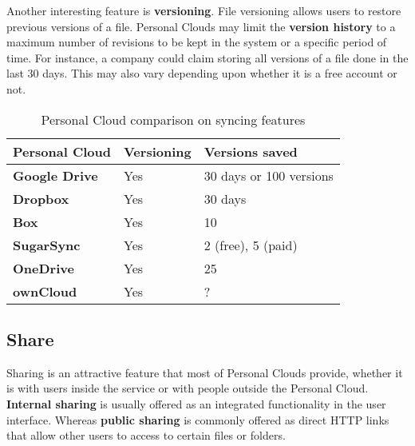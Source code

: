 Another interesting feature is \textbf{versioning}. File versioning allows users to restore previous versions of a file. Personal Clouds may limit the \textbf{version history} to a maximum number of revisions to be kept in the system or a specific period of time. For instance, a company could claim storing all versions of a file done in the last 30 days. This may also vary depending upon whether it is a free account or not.


{
\def\arraystretch{1.5}

\begin{table}
\begin{center}
    \begin{tabular}{ | p{3.3cm} | p{2cm} | p{2.9cm} | }
    \hline
    \rowcolor[gray]{0.8}

	\textbf{Personal Cloud} &
	\textbf{Versioning} & 
	\textbf{Versions saved} \\ \hline

	\textbf{Google Drive} &
	Yes &
	30 days or 100 versions \\ \hline

	\textbf{Dropbox} &
	Yes &
	30 days \\ \hline
	
	\textbf{Box} &
	Yes &
	10 \\ \hline
	
	\textbf{SugarSync} & 
	Yes &
	2 (free), 5 (paid) \\ \hline
	
	\textbf{OneDrive} & 
	Yes &
	25 \\ \hline
	
	\textbf{ownCloud} &
	Yes &
	? \\ \hline

    \end{tabular}
    \caption{Personal Cloud comparison on syncing features}
    \label{tab:pc_syncing}
\end{center}
\end{table}
}

\subsection{Share}


Sharing is an attractive feature that most of Personal Clouds provide, whether it is with users inside the service or with people outside the Personal Cloud. \textbf{Internal sharing} is usually offered as an integrated functionality in the user interface. Whereas \textbf{public sharing} is commonly offered as direct HTTP links that allow other users to access to certain files or folders.


